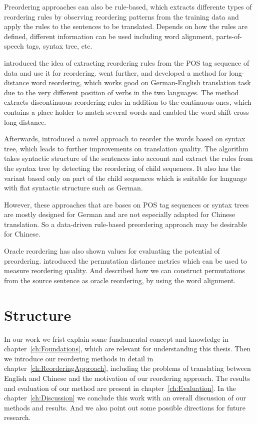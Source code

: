 Preordering approaches can also be rule-based, which extracts differente types of reordering rules by observing reordering patterns from the training data and apply the rules to the sentences to be translated. Depends on how the rules are defined, different information can be used including word alignment, parts-of-speech tags, syntax tree, etc.

\cite{short} introduced the idea of extracting reordering rules from the POS tag sequence of data and use it for reordering. \cite{long} went further, and developed a method for long-distance word reordering, which works good on German-English translation task due to the very different position of verbs in the two languages. The method extracts discontinuous reordering rules in addition to the continuous ones, which contains a place holder to match several words and enabled the word shift cross long distance.

Afterwards, \cite{tree} introduced a novel approach to reorder the words based on syntax tree, which leads to further improvements on translation quality. The algorithm takes syntactic structure of the sentences into account and extract the rules from the syntax tree by detecting the reordering of child sequences. It also has the variant based only on part of the child sequences which is suitable for language with flat syntactic structure such as German.

However, these approaches that are bases on POS tag sequences or syntax trees are mostly designed for German and are not especially adapted for Chinese translation. So a data-driven rule-based preordering approach may be desirable for Chinese.

Oracle reordering has also shown values for evaluating the potential of preordering. \cite{metrics} introduced the permutation distance metrics which can be used to measure reordering quality. And \cite{birch2} described how we can construct permutations from the source sentence as oracle reordering, by using the word alignment.

\section{Structure}
\label{ch:Introduction:sec:Structure}

In our work we frist explain some fundamental concept and knowledge in chapter~\ref{ch:Foundations}, which are relevant for understanding this thesis. Then we introduce our reordering methods in detail in chapter~\ref{ch:ReorderingApproach}, including the problems of translating between English and Chinese and the motivation of our reordering approach. The results and evaluation of our method are present in chapter~\ref{ch:Evaluation}. In the chapter~\ref{ch:Discussion} we conclude this work with an overall discussion of our methods and results. And we also point out some possible directions for future research.
